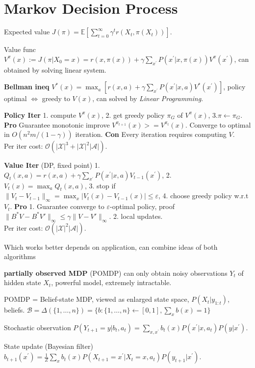 \section{Markov Decision Process}
Expected value $J(\pi)=\mathbb{E}[\sum_{t=0}^{\infty} \gamma^t r(X_t, \pi(X_t))]$.

Value func $V^\pi(x):=J(\pi | X_0=x)=r(x, \pi(x))+\gamma \sum_{x^{\prime}} P(x^{\prime} | x, \pi(x)) V^\pi(x^{\prime})$, can obtained by solving linear system.

\textbf{Bellman ineq} $V^*(x)=\max _a[r(x, a)+\gamma \sum_{x^{\prime}} P(x^{\prime} | x, a) V^*(x^{\prime})]$, policy optimal $\Leftrightarrow$ greedy to $V(x)$, can solved by \textit{Linear Programming}.

\textbf{Policy Iter} 1. compute $V^\pi(x)$, 2. get greedy policy $\pi_G$ of $V^\pi(x)$, 3.$\pi \leftarrow \pi_G$. \textbf{Pro} Guarantee monotonic improve $V^{\pi_{t+1}}(x) >= V^{\pi_{t}}(x)$. Converge to optimal in $O(n^2 m /(1-\gamma))$ iteration. \textbf{Con} Every iteration requires computing $V$.  \\ Per iter cost: $\mathcal{O}(|\mathcal{X}|^3+|\mathcal{X}|^2|\mathcal{A}|)$.

\textbf{Value Iter} (DP, fixed point) 1. $Q_t(x, a)=r(x, a)+\gamma \sum_{x^{\prime}} P(x^{\prime} | x, a) V_{t-1}(x^{\prime})$, 2. $V_t(x)=\max _a Q_t(x, a)$, 3. stop if $\|V_t-V_{t-1}\|_{\infty}=\max _x|V_t(x)-V_{t-1}(x)| \leq \varepsilon$, 4. choose greedy policy w.r.t $V_t$. \textbf{Pro} 1. Guarantee converge to $\varepsilon$-optimal policy, proof $\|B^{*} V - B^{*}V'\|_{\infty}\leq \gamma \|V - V'\|_{\infty}$. 2. local updates. \\ Per iter cost: $\mathcal{O}(|\mathcal{X}|^2|\mathcal{A}|)$.

 Which works better depends on application, can combine ideas of both algorithms

 \textbf{partially observed MDP} (POMDP) can only obtain noisy observations $Y_t$ of hidden state $X_t$, powerful model, extremely intractable. 

 POMDP = Belief-state MDP, viewed as enlarged state space, $P(X_t | y_{1: t})$, beliefs. $\mathcal{B}=\Delta(\{1, \ldots, n\})=\{b:\{1, \ldots, n\} \leftarrow[0,1], \sum_x b(x)=1\}$ 
 
Stochastic observation $P(Y_{t+1}=y | b_t, a_t)=\sum_{x, x^{\prime}} b_t(x) P(x^{\prime} | x, a_t) P(y | x^{\prime})$.

State update (Bayesian filter) $b_{t+1}(x^{\prime})=\frac{1}{Z} \sum_x b_t(x) P(X_{t+1}=x^{\prime} | X_t=x, a_t) P(y_{t+1} | x^{\prime})$.

